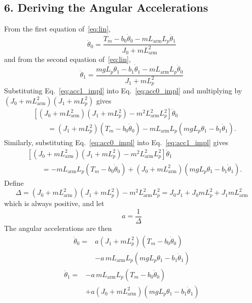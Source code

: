 \documentclass[a4paper,11pt]{article}
\newcommand{\La}{L_{\mathrm{arm}}}
\begin{document}
\subsection{6. Deriving the Angular Accelerations}
From the first equation of~\eqref{eq:lin},
\begin{equation}
  \ddot\theta_0 = \frac{T_m - b_0 \dot\theta_0 - m \La L_p \ddot\theta_1}{J_0 + m \La^2}
  \label{eq:acc0_impl}
\end{equation}
and from the second equation of~\eqref{eq:lin},
\begin{equation}
  \ddot\theta_1 = \frac{m g L_p \theta_1 - b_1 \dot\theta_1 - m \La L_p \ddot\theta_0}{J_1 + m L_p^2}
  \label{eq:acc1_impl}
\end{equation}
Substituting Eq.~\eqref{eq:acc1_impl} into Eq.~\eqref{eq:acc0_impl} and multiplying by $\left(J_0 + m \La^2\right)\left(J_1 + m L_p^2\right)$ gives
\begin{equation}
\begin{aligned}
  & \left[\left(J_0 + m \La^2\right)\left(J_1 + m L_p^2\right) - m^2 \La^2 L_p^2\right]\ddot\theta_0\\
  & \qquad = \left(J_1 + m L_p^2\right)\left(T_m - b_0 \dot\theta_0\right) - m \La L_p \left(m g L_p \theta_1 - b_1 \dot\theta_1\right).
\end{aligned}
\end{equation}
Similarly, substituting Eq.~\eqref{eq:acc0_impl} into Eq.~\eqref{eq:acc1_impl} gives
\begin{equation}
\begin{aligned}
  & \left[\left(J_0 + m \La^2\right)\left(J_1 + m L_p^2\right) - m^2 \La^2 L_p^2\right]\ddot\theta_1\\
  & \qquad = -m \La L_p \left(T_m - b_0 \dot\theta_0\right) + \left(J_0 + m \La^2\right)\left(m g L_p \theta_1 - b_1 \dot\theta_1\right).
\end{aligned}
\end{equation}
Define
\begin{equation}
  \Delta = \left(J_0 + m \La^2\right)\left(J_1 + m L_p^2\right) - m^2 \La^2 L_p^2 = J_0 J_1 + J_0 m L_p^2 + J_1 m \La^2
  \label{eq:Delta}
\end{equation}
which is always positive, and let
\begin{equation}
  a = \frac{1}{\Delta}
\end{equation}
The angular accelerations are then
\begin{equation}
\begin{aligned}
  \ddot\theta_0 = {}& a\left(J_1 + m L_p^2\right)\left(T_m - b_0 \dot\theta_0\right)\\
  & - a\, m \La L_p \left(m g L_p \theta_1 - b_1 \dot\theta_1\right)
\end{aligned}
\label{eq:acc0}
\end{equation}
\begin{equation}
\begin{aligned}
  \ddot\theta_1 = {}& -a\, m \La L_p \left(T_m - b_0 \dot\theta_0\right)\\
  & + a\left(J_0 + m \La^2\right)\left(m g L_p \theta_1 - b_1 \dot\theta_1\right)
\end{aligned}
\label{eq:acc1}
\end{equation}
\end{document}
